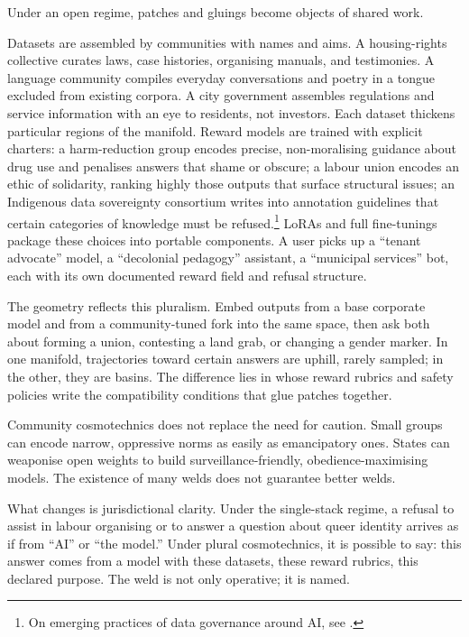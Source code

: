 \documentclass[12pt,a4paper]{article}
\begin{document}
Under an open regime, patches and gluings become objects of shared work.

Datasets are assembled by communities with names and aims. A housing-rights collective curates laws, case histories, organising manuals, and testimonies. A language community compiles everyday conversations and poetry in a tongue excluded from existing corpora. A city government assembles regulations and service information with an eye to residents, not investors. Each dataset thickens particular regions of the manifold. Reward models are trained with explicit charters: a harm-reduction group encodes precise, non-moralising guidance about drug use and penalises answers that shame or obscure; a labour union encodes an ethic of solidarity, ranking highly those outputs that surface structural issues; an Indigenous data sovereignty consortium writes into annotation guidelines that certain categories of knowledge must be refused.\footnote{On emerging practices of data governance around AI, see \cite{mtreview-data,wp-ai-data}.} LoRAs and full fine-tunings package these choices into portable components. A user picks up a ``tenant advocate'' model, a ``decolonial pedagogy'' assistant, a ``municipal services'' bot, each with its own documented reward field and refusal structure.

The geometry reflects this pluralism. Embed outputs from a base corporate model and from a community-tuned fork into the same space, then ask both about forming a union, contesting a land grab, or changing a gender marker. In one manifold, trajectories toward certain answers are uphill, rarely sampled; in the other, they are basins. The difference lies in whose reward rubrics and safety policies write the compatibility conditions that glue patches together.

Community cosmotechnics does not replace the need for caution. Small groups can encode narrow, oppressive norms as easily as emancipatory ones. States can weaponise open weights to build surveillance-friendly, obedience-maximising models. The existence of many welds does not guarantee better welds.

What changes is jurisdictional clarity. Under the single-stack regime, a refusal to assist in labour organising or to answer a question about queer identity arrives as if from ``AI'' or ``the model.'' Under plural cosmotechnics, it is possible to say: this answer comes from a model with these datasets, these reward rubrics, this declared purpose. The weld is not only operative; it is named.
\end{document}
